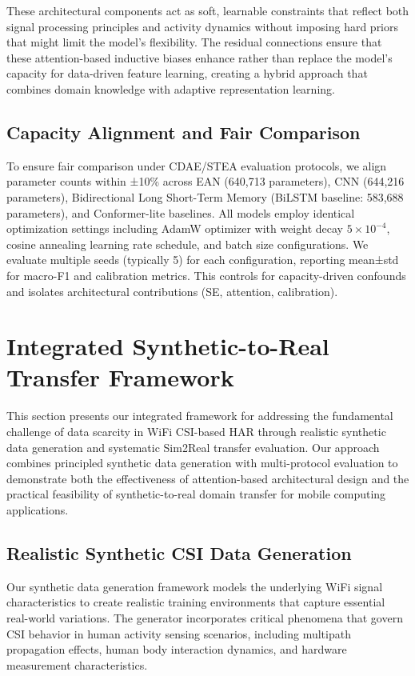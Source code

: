 \documentclass[lettersize,journal]{IEEEtran}
\begin{document}
These architectural components act as soft, learnable constraints that reflect both signal processing principles and activity dynamics without imposing hard priors that might limit the model's flexibility. The residual connections ensure that these attention-based inductive biases enhance rather than replace the model's capacity for data-driven feature learning, creating a hybrid approach that combines domain knowledge with adaptive representation learning.

\subsection{Capacity Alignment and Fair Comparison}

To ensure fair comparison under CDAE/STEA evaluation protocols, we align parameter counts within ±10\% across EAN (640,713 parameters), CNN (644,216 parameters), Bidirectional Long Short-Term Memory (BiLSTM baseline: 583,688 parameters), and Conformer-lite baselines. All models employ identical optimization settings including AdamW optimizer with weight decay $5 \times 10^{-4}$, cosine annealing learning rate schedule, and batch size configurations. We evaluate multiple seeds (typically 5) for each configuration, reporting mean±std for macro-F1 and calibration metrics. This controls for capacity-driven confounds and isolates architectural contributions (SE, attention, calibration).

\section{Integrated Synthetic-to-Real Transfer Framework}

This section presents our integrated framework for addressing the fundamental challenge of data scarcity in WiFi CSI-based HAR through realistic synthetic data generation and systematic Sim2Real transfer evaluation. Our approach combines principled synthetic data generation with multi-protocol evaluation to demonstrate both the effectiveness of attention-based architectural design and the practical feasibility of synthetic-to-real domain transfer for mobile computing applications.

\subsection{Realistic Synthetic CSI Data Generation}

Our synthetic data generation framework models the underlying WiFi signal characteristics to create realistic training environments that capture essential real-world variations. The generator incorporates critical phenomena that govern CSI behavior in human activity sensing scenarios, including multipath propagation effects, human body interaction dynamics, and hardware measurement characteristics.
\end{document}
